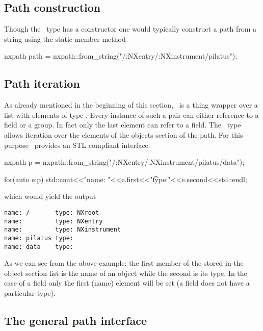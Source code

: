 \subsection{Path construction}

Though the \nxpath\ type has a constructor one would typically construct 
a path from a string using the  static member method
\begin{cppcode}
nxpath path = nxpath::from_string("/:NXentry/:NXinstrument/pilatus");
\end{cppcode}

\subsection{Path iteration}

As already mentioned in the beginning of this section, \nxpath\ is a thing 
wrapper over a list with elements of type . 
Every instance of such a pair can either reference to a field or a 
group. In fact only the last element can refer to a field. 
The \nxpath\ type allows iteration over the elements of the objects section of
the path. For this purpose \nxpath\ provides an STL compliant interface. 
\begin{cppcode}
nxpath p = nxpath::from_string("/:NXentry/:NXinstrument/pilatus/data");

for(auto e:p)
    std::cout<<"name: "<<e.first<<"\t type:"<<e.second<<std::endl;
\end{cppcode}
which would yield the output
\begin{verbatim}
name: /       type: NXroot
name:         type: NXentry
name:         type: NXinstrument
name: pilatus type: 
name: data    type: 
\end{verbatim}
As we can see from the above example: the first member of the
 stored in the object section list is the 
name of an object while the second is its type. In the case of a field 
only the first (name) element will be set (a field does not have a 
particular type).

\subsection{The general path interface}



